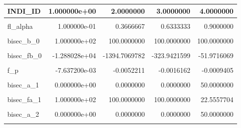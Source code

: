 \documentclass[
]{book}
\begin{document}
\begin{table}[!h]
\centering
\begin{tabular}{l|r|r|r|r}
\hline
INDI\_ID & 1.000000e+00 & 2.0000000 & 3.0000000 & 4.0000000\\
\hline
\cellcolor{gray!6}{fl\_A} & \cellcolor{gray!6}{-2.000000e+00} & \cellcolor{gray!6}{-0.6666667} & \cellcolor{gray!6}{0.6666667} & \cellcolor{gray!6}{2.0000000}\\
\hline
fl\_alpha & 1.000000e-01 & 0.3666667 & 0.6333333 & 0.9000000\\
\hline
\cellcolor{gray!6}{bisec\_a\_0} & \cellcolor{gray!6}{0.000000e+00} & \cellcolor{gray!6}{0.0000000} & \cellcolor{gray!6}{0.0000000} & \cellcolor{gray!6}{0.0000000}\\
\hline
bisec\_b\_0 & 1.000000e+02 & 100.0000000 & 100.0000000 & 100.0000000\\
\hline
\cellcolor{gray!6}{bisec\_fa\_0} & \cellcolor{gray!6}{1.000000e+02} & \cellcolor{gray!6}{100.0000000} & \cellcolor{gray!6}{100.0000000} & \cellcolor{gray!6}{100.0000000}\\
\hline
bisec\_fb\_0 & -1.288028e+04 & -1394.7069782 & -323.9421599 & -51.9716069\\
\hline
\cellcolor{gray!6}{p} & \cellcolor{gray!6}{1.544952e+00} & \cellcolor{gray!6}{8.5838318} & \cellcolor{gray!6}{24.8359680} & \cellcolor{gray!6}{65.0367737}\\
\hline
f\_p & -7.637200e-03 & -0.0052211 & -0.0016162 & -0.0009405\\
\hline
\cellcolor{gray!6}{f\_p\_t\_f\_a} & \cellcolor{gray!6}{-3.800000e-04} & \cellcolor{gray!6}{-0.0000237} & \cellcolor{gray!6}{-0.0000025} & \cellcolor{gray!6}{-0.0000002}\\
\hline
bisec\_a\_1 & 0.000000e+00 & 0.0000000 & 0.0000000 & 50.0000000\\
\hline
\cellcolor{gray!6}{bisec\_b\_1} & \cellcolor{gray!6}{5.000000e+01} & \cellcolor{gray!6}{50.0000000} & \cellcolor{gray!6}{50.0000000} & \cellcolor{gray!6}{100.0000000}\\
\hline
bisec\_fa\_1 & 1.000000e+02 & 100.0000000 & 100.0000000 & 22.5557704\\
\hline
\cellcolor{gray!6}{bisec\_fb\_1} & \cellcolor{gray!6}{-5.666956e+03} & \cellcolor{gray!6}{-595.7345364} & \cellcolor{gray!6}{-106.5105843} & \cellcolor{gray!6}{-51.9716069}\\
\hline
bisec\_a\_2 & 0.000000e+00 & 0.0000000 & 0.0000000 & 50.0000000\\
\hline
\cellcolor{gray!6}{bisec\_b\_2} & \cellcolor{gray!6}{2.500000e+01} & \cellcolor{gray!6}{25.0000000} & \cellcolor{gray!6}{25.0000000} & \cellcolor{gray!6}{75.0000000}\\

\end{tabular}
\end{table}
\end{document}
